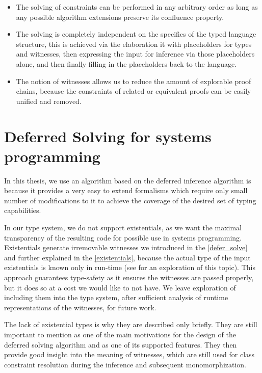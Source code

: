 \begin{itemize}
    \item  The solving of constraints can be performed in any arbitrary order as long as any possible algorithm extensions preserve its confluence property.

    \item The solving is completely independent on the specifics of the typed language structure, this is achieved via the elaboration it with placeholders for types and witnesses, then expressing the input for inference via those placeholders alone, and then finally filling in the placeholders back to the language.

    \item The notion of witnesses allows us to reduce the amount of explorable proof chains, because the constraints of related or equivalent proofs can be easily unified and removed.
\end{itemize}


\section{Deferred Solving for systems programming}
\label{sys_defer}

In this thesis, we use an algorithm based on the deferred inference algorithm is because it provides a very easy to extend formalisms which require only small number of modifications to it to achieve the coverage of the desired set of typing capabilities.

In our type system, we do not support existentials, as we want the maximal transparency of the resulting code for possible use in systems programming. Existentials generate irremovable witnesses we introduced in the \cref{defer_solve} and further explained in the \cref{existentials}, because the actual type of the input existentials is known only in run-time (see \cite{grossman2002existential} for an exploration of this topic). This approach guarantees type-safety as it ensures the witnesses are passed properly, but it does so at a cost we would like to not have. We leave exploration of including them into the type system, after sufficient analysis of runtime representations of the witnesses, for future work.

The lack of existential types is why they are described only briefly. They are still important to mention as one of the main motivations for the design of the deferred solving algorithm and as one of its supported features. They then provide good insight into the meaning of witnesses, which are still used for class constraint resolution during the inference and subsequent monomorphization.

